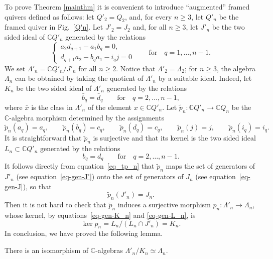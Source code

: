 To prove Theorem \ref{mainthm} it is convenient to introduce ``augmented'' framed quivers defined as follows:
let $Q'_{2}= Q_2$, and, for every $n\geq 3$, let $Q'_{n}$ be the framed quiver in Fig.~\ref{Q'n}. Let $J'_{2}= J_2$ and, for all $n\geq 3$, let $J'_{n}$ be the two sided ideal of $\mathbb{C} Q'_{n}$ generated by the relations
\begin{equation}
\begin{cases}
a_2d_{q+1}-a_1b_q =0, \\
d_{q+1}a_2-b_qa_1-i_qj =0
\end{cases}\qquad\text{for}\quad q=1,\dots,n-1 .
\label{eq-gen-J'}
\end{equation}
We set $\Lambda'_{n}=\mathbb{C} Q'_{n}/J'_{n}$ for all $n\geq2$. Notice that $\Lambda'_{2}=\Lambda_{2}$;
for $n\geq 3$, the algebra $\Lambda_{n}$ can be obtained by taking the quotient of $\Lambda'_{n}$ by a suitable ideal.
Indeed, let $K_{n}$ be the two sided ideal of $\Lambda'_{n}$ generated by the relations
\begin{equation}
\bar{b}_{q}=\bar{d}_q\qquad\text{for}\quad q=2,\dots, n-1 ,\label{eq-gen-K_n}
\end{equation}
where $\bar{x}$ is the class in $\Lambda'_{n}$ of the element $x \in \mathbb{C} Q'_{n}$.
Let $\tilde{p}_{n}\colon\mathbb{C} Q'_{n}\longrightarrow\mathbb{C} Q_{n}$ be the $\mathbb{C}$-algebra morphism determined by the assignments
\begin{equation}\label{eq_tp_n}
\tilde{p}_{n}(a_q) = a_q , \qquad \tilde{p}_{n}(b_q) = c_q ,\qquad \tilde{p}_{n}(d_q) = c_{q} ,\qquad
\tilde{p}_{n}(j) = j , \qquad \tilde{p}_{n}(i_q) = i_q .
\end{equation}
It is straightforward that $\tilde{p}_{n}$ is surjective and that its kernel is the two sided ideal $L_{n}\subset \mathbb{C} Q'_{n}$ generated by the relations
\begin{equation}
b_{q}=d_{q}\qquad\text{for}\quad q=2,\dots,n-1 .
\label{eq-gen-L_n}
\end{equation}
It follows directly from equation~\eqref{eq_tp_n} that $\tilde{p}_n$ maps the set of generators of $J'_n$ (see equation~\eqref{eq-gen-J'}) onto the set of generators of $J_n$ (see equation~\eqref{eq-gen-J}), so that
\begin{equation*}
\tilde{p}_{n}(J'_{n}) =J_{n} .
\end{equation*}
Then it is not hard to check that $\tilde{p}_{n}$ induces a surjective morphism $p_n\colon \Lambda'_n \to \Lambda_n$,
whose kernel, by equations~\eqref{eq-gen-K_n} and \eqref{eq-gen-L_n}, is
\begin{equation*}
\ker p_{n}= L_{n}/(L_{n}\cap J'_{n})=K_{n} .
\end{equation*}
In conclusion, we have proved the following lemma.
\begin{Lemma}\label{lm-Lambda'-->>Lambda}
There is an isomorphism of $\mathbb{C}$-algebras $\Lambda'_{n}/K_{n}\simeq \Lambda_{n}$.
\end{Lemma}

